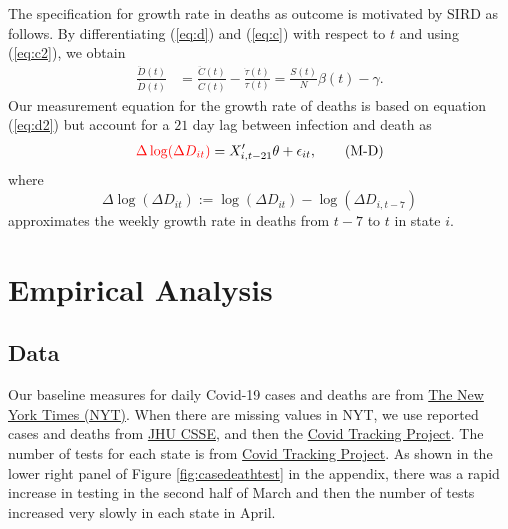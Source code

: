 \documentclass[11pt,reqno,letter]{amsart}
\theoremstyle{definition}
\def\ycolor{\color{red}}
\begin{document}
The specification for growth rate in deaths as outcome  is motivated by SIRD as follows. By differentiating (\ref{eq:d}) and (\ref{eq:c}) with respect to $t$ and using (\ref{eq:c2}), we obtain
\begin{align}
\frac{\ddot{D}(t) }{\dot D(t)}& = \frac{\ddot{C}(t) }{\dot C(t)}  - \frac{\dot{\tau}(t) }{ \tau(t)}    =  \frac{S(t)}{N}\beta(t)  -   \gamma.\label{eq:d2}
\end{align}
Our measurement equation for the growth rate of deaths is based on equation (\ref{eq:d2}) but   account for a $21$ day lag between infection and death as
\begin{align}
{\ycolor \Delta \log(\Delta D_{it})}  = X_{i,t-21}' \theta + \epsilon_{it},\label{eq:M-D} \tag{M-D}
\end{align}
where
\begin{equation} \label{eq:y-d}
 \Delta \log(\Delta D_{it}):= \log( \Delta D_{it} ) -
\log( \Delta D_{i,t-7})
\end{equation}
approximates the weekly growth rate in deaths from $t-7$ to $t$ in state $i$. %


\section{Empirical Analysis}
\subsection{Data}

Our baseline measures for daily Covid-19   cases and deaths are from
\href{https://github.com/nytimes/covid-19-data}{The New York Times (NYT)}. When there are missing values in NYT, we use reported cases and deaths from \href{https://github.com/CSSEGISandData/COVID-19}{JHU CSSE}, and then the
\href{https://github.com/COVID19Tracking/covid-tracking-data}{Covid
Tracking Project}.  The number of tests for each state is from  \href{https://github.com/COVID19Tracking/covid-tracking-data}{Covid
 Tracking Project}. As shown in the lower right panel of Figure \ref{fig:casedeathtest} in the appendix, there was a rapid increase in testing in the second half of March and then the
number of tests increased very slowly in each state in April.
\end{document}
